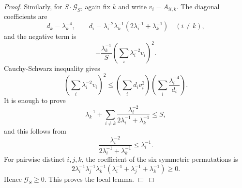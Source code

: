 \documentclass[11pt]{amsart}
\numberwithin{equation} {section}
\numberwithin{equation}{section}
\begin{document}
\begin{proof}
Similarly, for $S\cdot\mathcal G_S$, again fix $k$ and write $v_i=A_{ii,k}$. The diagonal
coefficients are
\[
        d_k=\lambda_k^{-4},\qquad
        d_i=\lambda_i^{-2}\lambda_k^{-1}
        (2\lambda_i^{-1}+\lambda_k^{-1})\quad (i\ne k),
\]
and the negative term is
\[
        -\frac{\lambda_k^{-1}}{S}
        \left(\sum_i\lambda_i^{-2}v_i\right)^2.
\]
Cauchy-Schwarz inequality gives
\[
        \left(\sum_i\lambda_i^{-2}v_i\right)^2
        \leq \left(\sum_i d_i v_i^2\right)
        \left(\sum_i\frac{\lambda_i^{-4}}{d_i}\right).
\]
It is enough to prove
\[
        \lambda_k^{-1}
        +\sum_{i\ne k}
        \frac{\lambda_i^{-2}}{2\lambda_i^{-1}+\lambda_k^{-1}}
        \leq S,
\]
and this follows from
\[
        \frac{\lambda_i^{-2}}{2\lambda_i^{-1}+\lambda_k^{-1}}
        \leq \lambda_i^{-1}.
\]
For pairwise distinct $i,j,k$, the coefficient of the six symmetric
permutations is
\[
        2\lambda_i^{-1}\lambda_j^{-1}\lambda_k^{-1}
        (\lambda_i^{-1}+\lambda_j^{-1}+\lambda_k^{-1})\geq0.
\]
Hence $\mathcal G_S\geq0$. This proves the local lemma. \hfill$\Box$


\end{proof}
\end{document}
